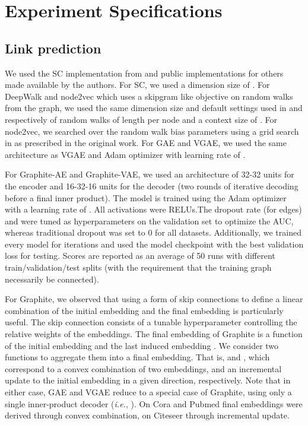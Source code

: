 \documentclass{article}
\newcommand{\name}{Graphite}
\begin{document}
\section{Experiment Specifications}\label{app:expt}




\subsection{Link prediction}




We used the SC implementation from \citep{pedregosa2011scikit} and public implementations for others made available by the authors. For SC, we used a dimension size of . For DeepWalk and node2vec which uses a skipgram like objective on random walks from the graph, we used the same dimension size and default settings used in \citep{perozzi2014deepwalk} and \citep{grover2016node2vec} respectively of  random walks of length  per node and a context size of . For node2vec, we searched over the random walk bias parameters using a grid search in  as prescribed in the original work. For GAE and VGAE, we used the same architecture as VGAE and Adam optimizer with learning rate of . 

For Graphite-AE and Graphite-VAE, we used an architecture of 32-32 units for the encoder and 16-32-16 units for the decoder (two rounds of iterative decoding before a final inner product). The model is trained using the Adam optimizer~\citep{kingma2013auto} with a learning rate of . All activations were RELUs.The dropout rate (for edges) and  were tuned as hyperparameters on the validation set to optimize the AUC, whereas traditional dropout was set to 0 for all datasets. Additionally, we trained every model for  iterations and used the model checkpoint with the best validation loss for testing.  Scores are reported as an average of 50 runs with different train/validation/test splits (with the requirement that the training graph necessarily be connected).

For \name{}, we observed that using a form of skip connections to define a linear combination of the initial embedding  and the final embedding  is particularly useful. The skip connection consists of a tunable hyperparameter  controlling the relative weights of the embeddings.
The final embedding of \name{} is a function of the initial embedding  and the last induced embedding .  We consider two functions to aggregate them into a final embedding.  That is,  and , which correspond to a convex combination of two embeddings, and an incremental update to the initial embedding in a given direction, respectively. Note that in either case, GAE and VGAE reduce to a special case of \name{}, using only a single inner-product decoder (\textit{i.e.}, ).  On Cora and Pubmed final embeddings were derived through convex combination, on Citeseer through incremental update.
\end{document}
